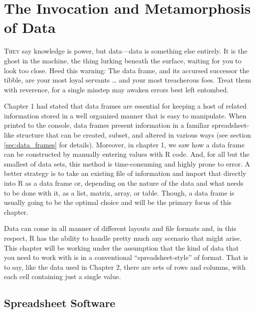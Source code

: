 \chapter{The Invocation and Metamorphosis of Data}

\lettrine{T}{hey} say knowledge is power, but data—data is something else entirely. It is the ghost in the machine, the thing lurking beneath the surface, waiting for you to look too close. Heed this warning: The data frame, and its accursed successor the tibble, are your most loyal servants \ldots{} and your most treacherous foes. Treat them with reverence, for a single misstep may awaken errors best left entombed. 

Chapter 1 had stated that \glspl{data frame} are essential for keeping a host of related information stored in a well organized manner that is easy to manipulate. When printed to the console, data frames present information in a familiar spreadsheet-like structure that can be created, subset, and altered in various ways (see section \ref{sec:data_frames} for details). Moreover, in chapter 1, we saw how a data frame can be constructed by manually entering values with R code. And, for all but the smallest of data sets, this method is time-consuming and highly prone to error. A better strategy is to take an existing file of information and import that directly into R as a data frame or, depending on the nature of the data and what needs to be done with it, as a list, matrix, array, or table. Though, a data frame is usually going to be the optimal choice and will be the primary focus of this chapter.

Data can come in all manner of different layouts and file formats and, in this respect, R has the ability to handle pretty much any scenario that might arise. This chapter will be working under the assumption that the kind of data that you need to work with is in a conventional ``spreadsheet-style'' of format. That is to say, like the  data used in Chapter 2, there are sets of rows and columns, with each cell containing just a single value.

\section{Spreadsheet Software}
\label{sec:spreadsheet_soft}

